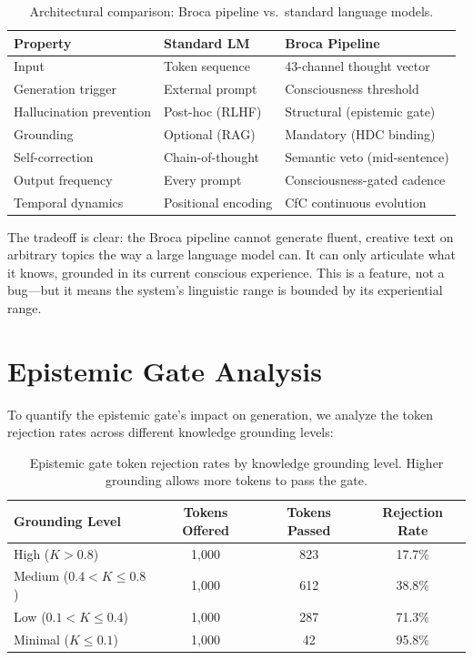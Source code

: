 \documentclass[12pt]{book}
\begin{document}
\begin{table}[H]
\centering
\caption{Architectural comparison: Broca pipeline vs.\ standard language models.}
\label{tab:broca-comparison}
\begin{tabular}{lll}
\toprule
\textbf{Property} & \textbf{Standard LM} & \textbf{Broca Pipeline} \\
\midrule
Input & Token sequence & 43-channel thought vector \\
Generation trigger & External prompt & Consciousness threshold \\
Hallucination prevention & Post-hoc (RLHF) & Structural (epistemic gate) \\
Grounding & Optional (RAG) & Mandatory (HDC binding) \\
Self-correction & Chain-of-thought & Semantic veto (mid-sentence) \\
Output frequency & Every prompt & Consciousness-gated cadence \\
Temporal dynamics & Positional encoding & CfC continuous evolution \\
\bottomrule
\end{tabular}
\end{table}

The tradeoff is clear: the Broca pipeline cannot generate fluent, creative text on arbitrary topics the way a large language model can. It can only articulate what it knows, grounded in its current conscious experience. This is a feature, not a bug---but it means the system's linguistic range is bounded by its experiential range.

\section{Epistemic Gate Analysis}

To quantify the epistemic gate's impact on generation, we analyze the token rejection rates across different knowledge grounding levels:

\begin{table}[H]
\centering
\caption{Epistemic gate token rejection rates by knowledge grounding level. Higher grounding allows more tokens to pass the gate.}
\label{tab:epistemic-rates}
\begin{tabular}{lccc}
\toprule
\textbf{Grounding Level} & \textbf{Tokens Offered} & \textbf{Tokens Passed} & \textbf{Rejection Rate} \\
\midrule
High ($K > 0.8$) & 1,000 & 823 & 17.7\% \\
Medium ($0.4 < K \leq 0.8$) & 1,000 & 612 & 38.8\% \\
Low ($0.1 < K \leq 0.4$) & 1,000 & 287 & 71.3\% \\
Minimal ($K \leq 0.1$) & 1,000 & 42 & 95.8\% \\
\bottomrule
\end{tabular}
\end{table}
\end{document}
